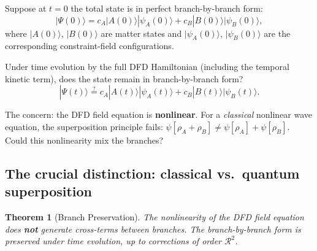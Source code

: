 \documentclass[12pt,a4paper]{article}
\newtheorem{theorem}{Theorem}[section]
\begin{document}
Suppose at $t = 0$ the total state is in perfect branch-by-branch form:
\begin{equation}\label{eq:initial-branch}
|\Psi(0)\rangle = c_A|A(0)\rangle|\psi_A(0)\rangle
+ c_B|B(0)\rangle|\psi_B(0)\rangle,
\end{equation}
where $|A(0)\rangle$, $|B(0)\rangle$ are matter states and
$|\psi_A(0)\rangle$, $|\psi_B(0)\rangle$ are the corresponding
constraint-field configurations.

Under time evolution by the full DFD Hamiltonian (including the temporal
kinetic term), does the state remain in branch-by-branch form?
\begin{equation}\label{eq:evolved}
|\Psi(t)\rangle \stackrel{?}{=} c_A|A(t)\rangle|\psi_A(t)\rangle
+ c_B|B(t)\rangle|\psi_B(t)\rangle.
\end{equation}

The concern: the DFD field equation is \textbf{nonlinear}. For a
\emph{classical} nonlinear wave equation, the superposition principle
fails: $\psi[\rho_A + \rho_B] \neq \psi[\rho_A] + \psi[\rho_B]$.
Could this nonlinearity mix the branches?

\subsection{The crucial distinction: classical vs.\ quantum superposition}

\begin{theorem}[Branch Preservation]
\label{thm:branch-preservation}
The nonlinearity of the DFD field equation does \textbf{not} generate
cross-terms between branches. The branch-by-branch form is preserved
under time evolution, up to corrections of order $\mathcal{R}^2$.
\end{theorem}
\end{document}
